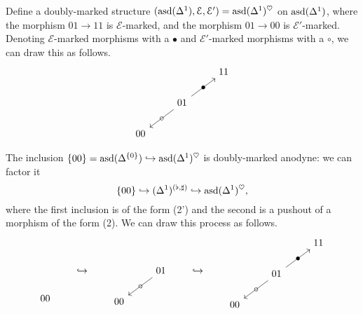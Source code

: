 \documentclass[main.tex]{subfiles}
\begin{document}
\begin{example}
  \label{eg:bimarking_on_asd_delta1}
  Define a doubly-marked structure $(\mathrm{asd}(\Delta^{1}), \mathcal{E}, \mathcal{E}') = \mathrm{asd}(\Delta^{1})^{\heartsuit}$ on $\mathrm{asd}(\Delta^{1})$, where the morphism $01 \to 11$ is $\mathcal{E}$-marked, and the morphism $01 \to 00$ is $\mathcal{E}'$-marked. Denoting $\mathcal{E}$-marked morphisms with a $\bullet$ and $\mathcal{E}'$-marked morphisms with a $\circ$, we can draw this as follows.
  \begin{equation*}
    \begin{tikzcd}
      && 11
      \\
      & 01
      \arrow[ur, "\bullet" marking]
      \arrow[dl, "\circ" marking]
      \\
      00
    \end{tikzcd}
  \end{equation*}

  The inclusion $\{00\} = \mathrm{asd}(\Delta^{\{0\}}) \hookrightarrow \mathrm{asd}(\Delta^{1})^{\heartsuit}$ is doubly-marked anodyne: we can factor it
  \begin{equation*}
    \{00\} \hookrightarrow (\Delta^{1})^{(\flat, \sharp)} \hookrightarrow \mathrm{asd}(\Delta^{1})^{\heartsuit},
  \end{equation*}
  where the first inclusion is of the form (2') and the second is a pushout of a morphism of the form (2). We can draw this process as follows.
  \begin{equation*}
    \begin{tikzcd}
      \
      \\
      \
      \\
      00
    \end{tikzcd}
    \qquad\hookrightarrow\qquad
    \begin{tikzcd}
      & \
      \\
      & 01
      \arrow[dl, "\circ" marking]
      \\
      00
    \end{tikzcd}
    \qquad\hookrightarrow\qquad
    \begin{tikzcd}
      && 11
      \\
      & 01
      \arrow[ur, "\bullet" marking]
      \arrow[dl, "\circ" marking]
      \\
      00
    \end{tikzcd}
  \end{equation*}
\end{example}
\end{document}
